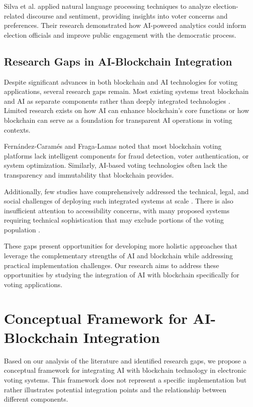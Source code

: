 \documentclass[conference]{IEEEtran}
\begin{document}
Silva et al. \cite{b20} applied natural language processing techniques to analyze election-related discourse and sentiment, providing insights into voter concerns and preferences. Their research demonstrated how AI-powered analytics could inform election officials and improve public engagement with the democratic process.

\subsection{Research Gaps in AI-Blockchain Integration}
Despite significant advances in both blockchain and AI technologies for voting applications, several research gaps remain. Most existing systems treat blockchain and AI as separate components rather than deeply integrated technologies \cite{b9}. Limited research exists on how AI can enhance blockchain's core functions or how blockchain can serve as a foundation for transparent AI operations in voting contexts.

Fernández-Caramés and Fraga-Lamas \cite{b9} noted that most blockchain voting platforms lack intelligent components for fraud detection, voter authentication, or system optimization. Similarly, AI-based voting technologies often lack the transparency and immutability that blockchain provides.

Additionally, few studies have comprehensively addressed the technical, legal, and social challenges of deploying such integrated systems at scale \cite{b10}. There is also insufficient attention to accessibility concerns, with many proposed systems requiring technical sophistication that may exclude portions of the voting population \cite{b7}.

These gaps present opportunities for developing more holistic approaches that leverage the complementary strengths of AI and blockchain while addressing practical implementation challenges. Our research aims to address these opportunities by studying the integration of AI with blockchain specifically for voting applications.

\section{Conceptual Framework for AI-Blockchain Integration}
Based on our analysis of the literature and identified research gaps, we propose a conceptual framework for integrating AI with blockchain technology in electronic voting systems. This framework does not represent a specific implementation but rather illustrates potential integration points and the relationship between different components.
\end{document}
